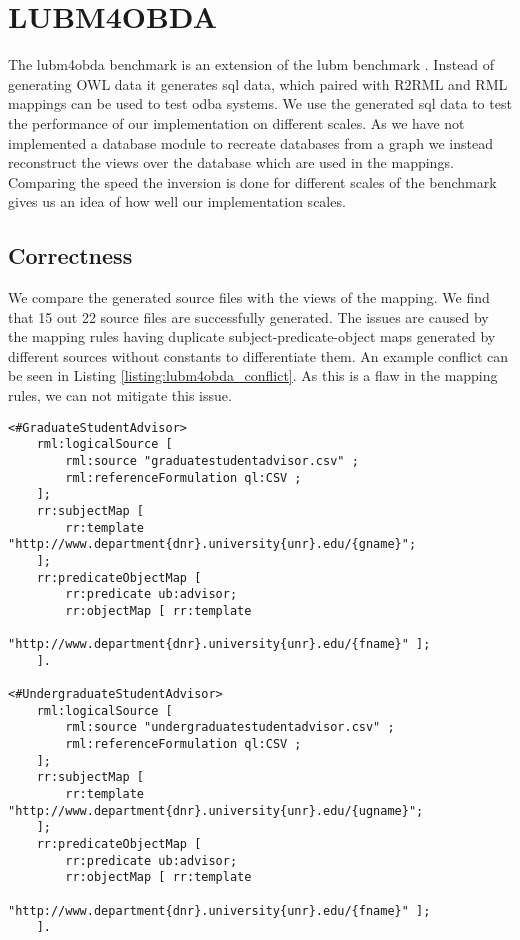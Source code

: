 \section{LUBM4OBDA}
\label{section:lubm4obda}
The \acrfull{lubm4obda} benchmark \citep{LUBM4OBDA} is an extension of the \acrfull{lubm} benchmark \citep{LUBM}. Instead of generating OWL data it generates sql data, which paired with R2RML and RML mappings can be used to test \acrshort{odba} systems. We use the generated sql data to test the performance of our implementation on different scales. As we have not implemented a database module to recreate databases from a graph we instead reconstruct the views over the database which are used in the mappings. Comparing the speed the inversion is done for different scales of the benchmark gives us an idea of how well our implementation scales.

\subsection{Correctness}
We compare the generated source files with the views of the mapping. We find that 15 out 22 source files are successfully generated. The issues are caused by the mapping rules having duplicate subject-predicate-object maps generated by different sources without constants to differentiate them. An example conflict can be seen in Listing \ref{listing:lubm4obda_conflict}. As this is a flaw in the mapping rules, we can not mitigate this issue.

\begin{lstlisting}[caption={Example of a duplicate mapping pattern in the LUBM4OBDA benchmark}, captionpos=b, label={listing:lubm4obda_conflict}, basicstyle=\small, frame=single]
<#GraduateStudentAdvisor>
    rml:logicalSource [ 
        rml:source "graduatestudentadvisor.csv" ;
        rml:referenceFormulation ql:CSV ;
    ];
    rr:subjectMap [
        rr:template "http://www.department{dnr}.university{unr}.edu/{gname}";
    ];
    rr:predicateObjectMap [
        rr:predicate ub:advisor;
        rr:objectMap [ rr:template 
                "http://www.department{dnr}.university{unr}.edu/{fname}" ];
    ].

<#UndergraduateStudentAdvisor>
    rml:logicalSource [ 
        rml:source "undergraduatestudentadvisor.csv" ;
        rml:referenceFormulation ql:CSV ;
    ];
    rr:subjectMap [
        rr:template "http://www.department{dnr}.university{unr}.edu/{ugname}";
    ];
    rr:predicateObjectMap [
        rr:predicate ub:advisor;
        rr:objectMap [ rr:template 
                "http://www.department{dnr}.university{unr}.edu/{fname}" ];
    ].
\end{lstlisting}

